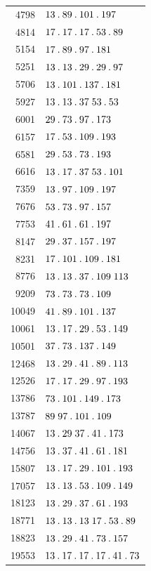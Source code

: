 \begin{longtable}{@{}r|l@{}}
4798 & $13\mathbin{.} 89\mathbin{.} 101\mathbin{.} 197$\\
4814 & $17\mathbin{.} 17\mathbin{.} 17\mathbin{.} 53\mathbin{.} 89$\\
5154 & $17\mathbin{.} 89\mathbin{.} 97\mathbin{.} 181$\\
5251 & $13\mathbin{.} 13\mathbin{.} 29\mathbin{.} 29\mathbin{.} 97$\\
5706 & $13\mathbin{.} 101\mathbin{.} 137\mathbin{.} 181$\\
5927 & $13\mathbin{.} 13\mathbin{.} 37\;53\mathbin{.} 53$\\
6001 & $29\mathbin{.} 73\mathbin{.} 97\mathbin{.} 173$\\
6157 & $17\mathbin{.} 53\mathbin{.} 109\mathbin{.} 193$\\
6581 & $29\mathbin{.} 53\mathbin{.} 73\mathbin{.} 193$\\
6616 & $13\mathbin{.} 17\mathbin{.} 37\;53\mathbin{.} 101$\\
7359 & $13\mathbin{.} 97\mathbin{.} 109\mathbin{.} 197$\\
7676 & $53\mathbin{.} 73\mathbin{.} 97\mathbin{.} 157$\\
7753 & $41\mathbin{.} 61\mathbin{.} 61\mathbin{.} 197$\\
8147 & $29\mathbin{.} 37\mathbin{.} 157\mathbin{.} 197$\\
8231 & $17\mathbin{.} 101\mathbin{.} 109\mathbin{.} 181$\\
8776 & $13\mathbin{.} 13\mathbin{.} 37\mathbin{.} 109\;113$\\
9209 & $73\mathbin{.} 73\mathbin{.} 73\mathbin{.} 109$\\
10049 & $41\mathbin{.} 89\mathbin{.} 101\mathbin{.} 137$\\
10061 & $13\mathbin{.} 17\mathbin{.} 29\mathbin{.} 53\mathbin{.} 149$\\
10501 & $37\mathbin{.} 73\mathbin{.} 137\mathbin{.} 149$\\
12468 & $13\mathbin{.} 29\mathbin{.} 41\mathbin{.} 89\mathbin{.} 113$\\
12526 & $17\mathbin{.} 17\mathbin{.} 29\mathbin{.} 97\mathbin{.} 193$\\
13786 & $73\mathbin{.} 101\mathbin{.} 149\mathbin{.} 173$\\
13787 & $89\;97\mathbin{.} 101\mathbin{.} 109$\\
14067 & $13\mathbin{.} 29\;37\mathbin{.} 41\mathbin{.} 173$\\
14756 & $13\mathbin{.} 37\mathbin{.} 41\mathbin{.} 61\mathbin{.} 181$\\
15807 & $13\mathbin{.} 17\mathbin{.} 29\mathbin{.} 101\mathbin{.} 193$\\
17057 & $13\mathbin{.} 13\mathbin{.} 53\mathbin{.} 109\mathbin{.} 149$\\
18123 & $13\mathbin{.} 29\mathbin{.} 37\mathbin{.} 61\mathbin{.} 193$\\
18771 & $13\mathbin{.} 13\mathbin{.} 13\;17\mathbin{.} 53\mathbin{.} 89$\\
18823 & $13\mathbin{.} 29\mathbin{.} 41\mathbin{.} 73\mathbin{.} 157$\\
19553 & $13\mathbin{.} 17\mathbin{.} 17\mathbin{.} 17\mathbin{.} 41\mathbin{.} 73$\\

\end{longtable}
